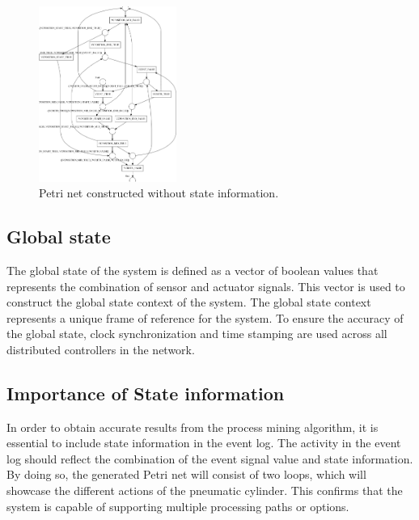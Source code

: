 \documentclass{ieeeojies}
\begin{document}
\begin{figure}[!t]
	\centering
	\includegraphics[width=0.4\textwidth]{images/StatelessPN.PNG}
	\caption{Petri net constructed without state information.}
	\label{StatelessPN}
\end{figure}

\subsection{Global state}


The global state of the system is defined as a vector of boolean values that represents the combination of sensor and actuator signals. This vector is used to construct the global state context of the system. The global state context represents a unique frame of reference for the system. To ensure the accuracy of the global state, clock synchronization and time stamping are used across all distributed controllers in the network.

\subsection{Importance of State information}

In order to obtain accurate results from the process mining algorithm, it is essential to include state information in the event log. The activity in the event log should reflect the combination of the event signal value and state information. By doing so, the generated Petri net will consist of two loops, which will showcase the different actions of the pneumatic cylinder. This confirms that the system is capable of supporting multiple processing paths or options.
\end{document}

